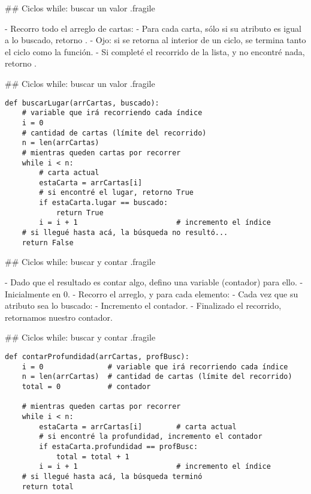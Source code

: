 ## Ciclos while: buscar un valor {.fragile}


\vspace{1ex}

- Recorro todo el arreglo de cartas:
    - Para cada carta, sólo si su atributo  es igual a lo buscado, retorno .
    - Ojo: si se retorna al interior de un ciclo, se termina tanto el ciclo como la función.
- Si completé el recorrido de la lista, y no encontré nada, retorno .

## Ciclos while: buscar un valor {.fragile}


\begin{lstlisting}[style=frame02]
def buscarLugar(arrCartas, buscado):
    # variable que irá recorriendo cada índice
    i = 0
    # cantidad de cartas (límite del recorrido)
    n = len(arrCartas)
    # mientras queden cartas por recorrer
    while i < n:
        # carta actual
        estaCarta = arrCartas[i]
        # si encontré el lugar, retorno True
        if estaCarta.lugar == buscado:
            return True
        i = i + 1                       # incremento el índice
    # si llegué hasta acá, la búsqueda no resultó...
    return False
\end{lstlisting}

## Ciclos while: buscar y contar {.fragile}


\vspace{1ex}

- Dado que el resultado es contar algo, defino una variable (contador) para ello.
    - Inicialmente en 0.
- Recorro el arreglo, y para cada elemento:
    - Cada vez que su atributo  sea lo buscado:
        - Incremento el contador.
- Finalizado el recorrido, retornamos nuestro contador.

## Ciclos while: buscar y contar {.fragile}


\begin{lstlisting}[style=frame02]
def contarProfundidad(arrCartas, profBusc):
    i = 0               # variable que irá recorriendo cada índice
    n = len(arrCartas)  # cantidad de cartas (límite del recorrido)
    total = 0           # contador

    # mientras queden cartas por recorrer
    while i < n:
        estaCarta = arrCartas[i]        # carta actual
        # si encontré la profundidad, incremento el contador
        if estaCarta.profundidad == profBusc:
            total = total + 1
        i = i + 1                       # incremento el índice
    # si llegué hasta acá, la búsqueda terminó
    return total
\end{lstlisting}

